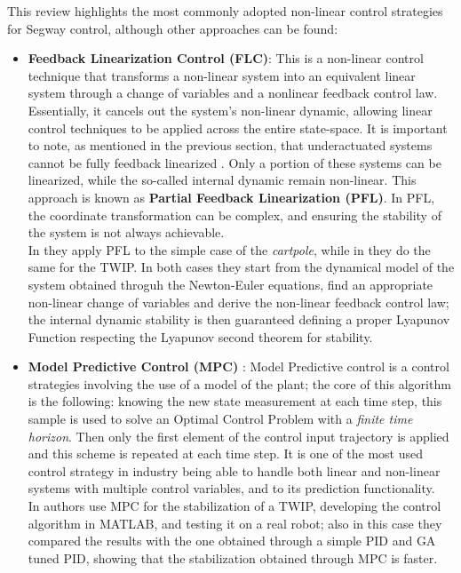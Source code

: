  This review highlights the most commonly adopted non-linear control strategies for Segway control, although other approaches can be found: 

\begin{itemize}
    \item \textbf{Feedback Linearization Control (FLC)}: This is a non-linear control technique that transforms a non-linear system into an equivalent linear system through a change of variables and a nonlinear feedback control law. Essentially, it cancels out the system's non-linear dynamic, allowing linear control techniques to be applied across the entire state-space.
    It is important to note, as mentioned in the previous section, that underactuated systems cannot be fully feedback linearized \cite{Henson-et-al, Sastry1999}. Only a portion of these systems can be linearized, while the so-called internal dynamic remain non-linear. 
    This approach is known as \textbf{Partial Feedback Linearization (PFL)}. In PFL, the coordinate transformation can be complex, and ensuring the stability of the system is not always achievable.
    \\
    In \cite{Acosta-et-al} they apply PFL to the simple case of the \textit{cartpole}, while in \cite{Pathak-et-al} they do the same for the TWIP.
    In both cases they start from the dynamical model of the system obtained throguh the Newton-Euler equations, find an appropriate non-linear change of variables and derive the non-linear feedback control law; the internal dynamic stability is then guaranteed defining a proper Lyapunov Function respecting the Lyapunov second theorem for stability.
    
    \item \textbf{Model Predictive Control (MPC)} \cite{Liuping-MPC}: Model Predictive control is a control strategies involving the use of a model of the plant; the core of this algorithm is the following: knowing the new state measurement at each time step, this sample is used to solve an Optimal Control Problem with a \textit{finite time horizon}. Then only the first element of the control input trajectory is applied and this scheme is repeated at each time step.
    It is one of the most used control strategy in industry being able to handle both linear and non-linear systems with multiple control variables, and to its prediction functionality. 
    \\
    In \cite{Prabhakar-et-al} authors use MPC for the stabilization of a TWIP, developing the control algorithm in MATLAB, and testing it on a real robot; also in this case they compared the results with the one obtained through a simple PID and GA tuned PID, showing that the stabilization obtained through MPC is faster.
\end{itemize}



